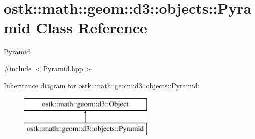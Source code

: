\hypertarget{classostk_1_1math_1_1geom_1_1d3_1_1objects_1_1_pyramid}{}\section{ostk\+:\+:math\+:\+:geom\+:\+:d3\+:\+:objects\+:\+:Pyramid Class Reference}
\label{classostk_1_1math_1_1geom_1_1d3_1_1objects_1_1_pyramid}


\hyperlink{classostk_1_1math_1_1geom_1_1d3_1_1objects_1_1_pyramid}{Pyramid}.  




{\ttfamily \#include $<$Pyramid.\+hpp$>$}

Inheritance diagram for ostk\+:\+:math\+:\+:geom\+:\+:d3\+:\+:objects\+:\+:Pyramid\+:\begin{figure}[H]
\begin{center}
\leavevmode
\includegraphics[height=2.000000cm]{classostk_1_1math_1_1geom_1_1d3_1_1objects_1_1_pyramid}
\end{center}
\end{figure}
